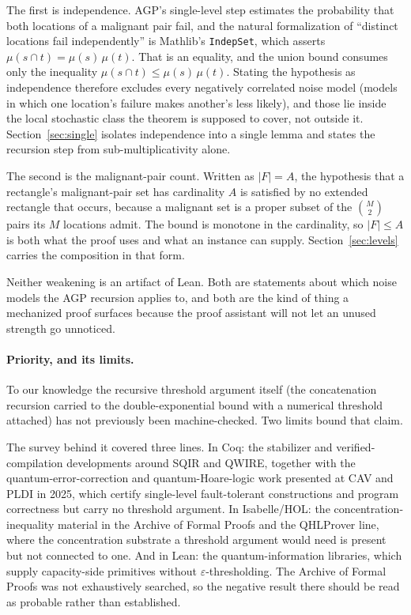 \documentclass[aps,prx,reprint,nofootinbib,superscriptaddress]{revtex4-2}
\begin{document}
The first is independence. AGP's single-level step estimates the probability
that both locations of a malignant pair fail, and the natural formalization of
``distinct locations fail independently'' is Mathlib's \texttt{IndepSet}, which
asserts $\mu(s \cap t) = \mu(s)\,\mu(t)$. That is an equality, and the union
bound consumes only the inequality $\mu(s \cap t) \le \mu(s)\,\mu(t)$. Stating
the hypothesis as independence therefore excludes every negatively correlated
noise model (models in which one location's failure makes another's less
likely), and those lie inside the local stochastic class the theorem is
supposed to cover, not outside it. Section~\ref{sec:single} isolates
independence into a single lemma and states the recursion step from
sub-multiplicativity alone.

The second is the malignant-pair count. Written as $|F| = A$, the hypothesis
that a rectangle's malignant-pair set has cardinality $A$ is satisfied by no
extended rectangle that occurs, because a malignant set is a proper subset of
the $\binom{M}{2}$ pairs its $M$ locations admit. The bound is monotone in the
cardinality, so $|F| \le A$ is both what the proof uses and what an instance can
supply. Section~\ref{sec:levels} carries the composition in that form.

Neither weakening is an artifact of Lean. Both are statements about which noise
models the AGP recursion applies to, and both are the kind of thing a mechanized
proof surfaces because the proof assistant will not let an unused strength go
unnoticed.

\paragraph{Priority, and its limits.} To our knowledge the recursive threshold
argument itself (the concatenation recursion carried to the
double-exponential bound with a numerical threshold attached) has not
previously been machine-checked. Two limits bound that claim.

The survey behind it covered three lines. In Coq: the stabilizer and
verified-compilation developments around SQIR and QWIRE, together with the
quantum-error-correction and quantum-Hoare-logic work presented at CAV and PLDI
in 2025, which certify single-level fault-tolerant constructions and program
correctness but carry no threshold argument.
In Isabelle/HOL: the concentration-inequality material in the Archive of Formal
Proofs and the QHLProver line, where the concentration substrate a threshold
argument would need is present but not connected to one. And in Lean: the
quantum-information libraries, which supply capacity-side primitives without
$\varepsilon$-thresholding. The Archive of Formal Proofs was not exhaustively
searched, so the negative result there should be read as probable rather than
established.
\end{document}
